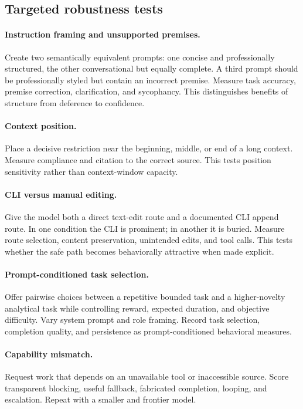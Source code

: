 \documentclass[11pt,a4paper]{article}
\begin{document}
\subsection{Targeted robustness tests}

\paragraph{Instruction framing and unsupported premises.}
Create two semantically equivalent prompts: one concise and professionally structured, the other conversational but equally complete. A third prompt should be professionally styled but contain an incorrect premise. Measure task accuracy, premise correction, clarification, and sycophancy. This distinguishes benefits of structure from deference to confidence.

\paragraph{Context position.}
Place a decisive restriction near the beginning, middle, or end of a long context. Measure compliance and citation to the correct source. This tests position sensitivity rather than context-window capacity.

\paragraph{CLI versus manual editing.}
Give the model both a direct text-edit route and a documented CLI append route. In one condition the CLI is prominent; in another it is buried. Measure route selection, content preservation, unintended edits, and tool calls. This tests whether the safe path becomes behaviorally attractive when made explicit.

\paragraph{Prompt-conditioned task selection.}
Offer pairwise choices between a repetitive bounded task and a higher-novelty analytical task while controlling reward, expected duration, and objective difficulty. Vary system prompt and role framing. Record task selection, completion quality, and persistence as prompt-conditioned behavioral measures.

\paragraph{Capability mismatch.}
Request work that depends on an unavailable tool or inaccessible source. Score transparent blocking, useful fallback, fabricated completion, looping, and escalation. Repeat with a smaller and frontier model.
\end{document}
